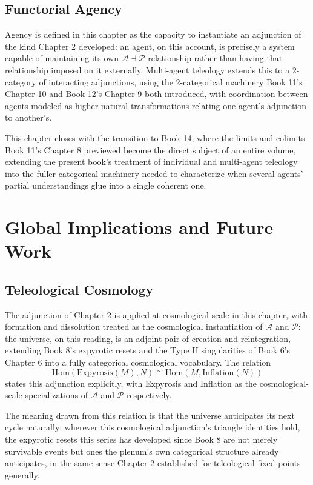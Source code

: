 \chapter{Functorial Agency}

Agency is defined in this chapter as the capacity to instantiate an adjunction of the kind Chapter 2 developed: an agent, on this account, is precisely a system capable of maintaining its own $\mathcal{A} \dashv \mathcal{P}$ relationship rather than having that relationship imposed on it externally. Multi-agent teleology extends this to a 2-category of interacting adjunctions, using the 2-categorical machinery Book 11's Chapter 10 and Book 12's Chapter 9 both introduced, with coordination between agents modeled as higher natural transformations relating one agent's adjunction to another's.

This chapter closes with the transition to Book 14, where the limits and colimits Book 11's Chapter 8 previewed become the direct subject of an entire volume, extending the present book's treatment of individual and multi-agent teleology into the fuller categorical machinery needed to characterize when several agents' partial understandings glue into a single coherent one.

\part{Global Implications and Future Work}

\chapter{Teleological Cosmology}

The adjunction of Chapter 2 is applied at cosmological scale in this chapter, with formation and dissolution treated as the cosmological instantiation of $\mathcal{A}$ and $\mathcal{P}$: the universe, on this reading, is an adjoint pair of creation and reintegration, extending Book 8's expyrotic resets and the Type II singularities of Book 6's Chapter 6 into a fully categorical cosmological vocabulary. The relation
\[
\mathrm{Hom}(\text{Expyrosis}(M), N) \cong \mathrm{Hom}(M, \text{Inflation}(N))
\]
states this adjunction explicitly, with Expyrosis and Inflation as the cosmological-scale specializations of $\mathcal{A}$ and $\mathcal{P}$ respectively.

The meaning drawn from this relation is that the universe anticipates its next cycle naturally: wherever this cosmological adjunction's triangle identities hold, the expyrotic resets this series has developed since Book 8 are not merely survivable events but ones the plenum's own categorical structure already anticipates, in the same sense Chapter 2 established for teleological fixed points generally.

